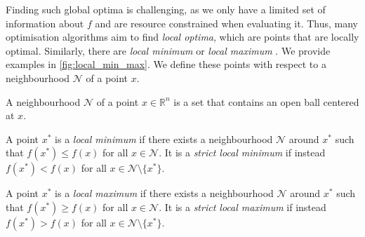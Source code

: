 Finding such global optima is challenging, as we only have a limited set of information about $f$ and are resource constrained when evaluating it. Thus, many optimisation algorithms aim to find \textit{local optima}, which are points that are locally optimal. Similarly, there are \textit{local minimum} or \textit{local maximum} \citep{NoceWrig06, deep_learning_book}. We provide examples in \cref{fig:local_min_max}. We define these points with respect to a neighbourhood $\mathcal{N}$ of a point $x$.

\begin{definition}[Neighbourhood]
    A neighbourhood $\mathcal{N}$ of a point $x \in \mathbb{R}^n$ is a set that contains an open ball centered at $x$.
\end{definition}

\begin{definition}
    A point $x^*$ is a \textit{local minimum} if there exists a neighbourhood $\mathcal{N}$ around $x^*$ such that $f(x^*) \leq f(x)$ for all $x \in \mathcal{N}$. It is a \textit{strict local minimum} if instead $f(x^*) < f(x)$ for all $x \in \mathcal{N} \setminus \{x^*\}$.
\end{definition}

\begin{definition}
    A point $x^*$ is a \textit{local maximum} if there exists a neighbourhood $\mathcal{N}$ around $x^*$ such that $f(x^*) \geq f(x)$ for all $x \in \mathcal{N}$. It is a \textit{strict local maximum} if instead $f(x^*) > f(x)$ for all $x \in \mathcal{N} \setminus \{x^*\}$.
\end{definition}

